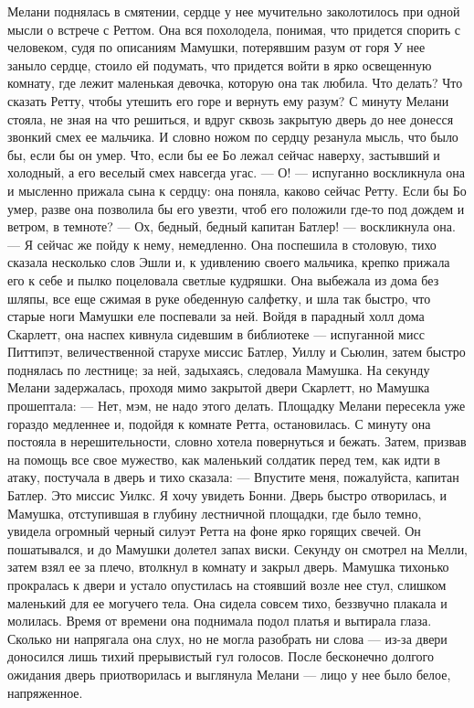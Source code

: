 Мелани поднялась в смятении, сердце у нее мучительно заколотилось при одной мысли о встрече с Реттом. Она вся похолодела, понимая, что придется спорить с человеком, судя по описаниям Мамушки, потерявшим разум от горя У нее заныло сердце, стоило ей подумать, что придется войти в ярко освещенную комнату, где лежит маленькая девочка, которую она так любила. Что делать? Что сказать Ретту, чтобы утешить его горе и вернуть ему разум? С минуту Мелани стояла, не зная на что решиться, и вдруг сквозь закрытую дверь до нее донесся звонкий смех ее мальчика. И словно ножом по сердцу резанула мысль, что было бы, если бы он умер. Что, если бы ее Бо лежал сейчас наверху, застывший и холодный, а его веселый смех навсегда угас.
— О! — испуганно воскликнула она и мысленно прижала сына к сердцу: она поняла, каково сейчас Ретту. Если бы Бо умер, разве она позволила бы его увезти, чтоб его положили где-то под дождем и ветром, в темноте? — Ох, бедный, бедный капитан Батлер! — воскликнула она. — Я сейчас же пойду к нему, немедленно.
Она поспешила в столовую, тихо сказала несколько слов Эшли и, к удивлению своего мальчика, крепко прижала его к себе и пылко поцеловала светлые кудряшки.
Она выбежала из дома без шляпы, все еще сжимая в руке обеденную салфетку, и шла так быстро, что старые ноги Мамушки еле поспевали за ней. Войдя в парадный холл дома Скарлетт, она наспех кивнула сидевшим в библиотеке — испуганной мисс Питтипэт, величественной старухе миссис Батлер, Уиллу и Сьюлин, затем быстро поднялась по лестнице; за ней, задыхаясь, следовала Мамушка. На секунду Мелани задержалась, проходя мимо закрытой двери Скарлетт, но Мамушка прошептала:
— Нет, мэм, не надо этого делать.
Площадку Мелани пересекла уже гораздо медленнее и, подойдя к комнате Ретта, остановилась. С минуту она постояла в нерешительности, словно хотела повернуться и бежать. Затем, призвав на помощь все свое мужество, как маленький солдатик перед тем, как идти в атаку, постучала в дверь и тихо сказала:
— Впустите меня, пожалуйста, капитан Батлер. Это миссис Уилкс. Я хочу увидеть Бонни.
Дверь быстро отворилась, и Мамушка, отступившая в глубину лестничной площадки, где было темно, увидела огромный черный силуэт Ретта на фоне ярко горящих свечей. Он пошатывался, и до Мамушки долетел запах виски. Секунду он смотрел на Мелли, затем взял ее за плечо, втолкнул в комнату и закрыл дверь.
Мамушка тихонько прокралась к двери и устало опустилась на стоявший возле нее стул, слишком маленький для ее могучего тела. Она сидела совсем тихо, беззвучно плакала и молилась. Время от времени она поднимала подол платья и вытирала глаза. Сколько ни напрягала она слух, но не могла разобрать ни слова — из-за двери доносился лишь тихий прерывистый гул голосов. После бесконечно долгого ожидания дверь приотворилась и выглянула Мелани — лицо у нее было белое, напряженное.
